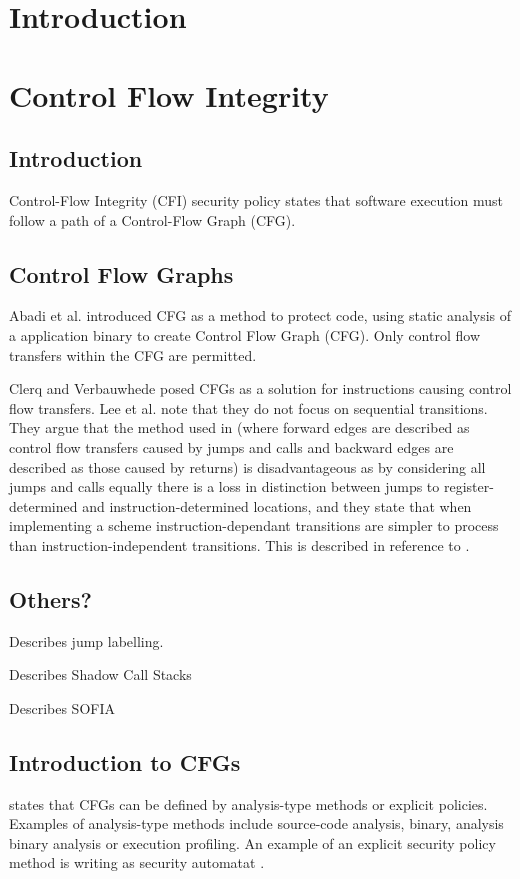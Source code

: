 \section{Introduction}
\section{Control Flow Integrity}
\subsection{Introduction}
Control-Flow Integrity (CFI) security policy states that software execution must follow a path of a Control-Flow Graph (CFG).
\subsection{Control Flow Graphs}
Abadi et al. \cite{Abadi2005}introduced CFG as a method to protect code, using static analysis of a application binary to create Control Flow Graph (CFG). Only control flow transfers within the CFG are permitted.

Clerq and Verbauwhede \cite{DeClercq2017} posed CFGs as a solution for instructions causing control flow transfers. Lee et al. \cite{Lee2019} note that they do not focus on sequential transitions. They argue that the method used in \cite{DeClercq2017} (where forward edges are described as control flow transfers caused by jumps and calls and backward edges are described as those caused by returns) is disadvantageous as by considering all jumps and calls equally there is a loss in distinction between jumps to register-determined and instruction-determined locations, and they state that when implementing a scheme instruction-dependant transitions are simpler to process than instruction-independent transitions. This is described in reference to \cite{Lee2016}.
\ifnotesincluded
{}
\fi
\subsection{Others?}
\cite{Abadi2005} Describes jump labelling. 

\cite{DeClercq2017} Describes Shadow Call Stacks

\cite{DeClercq2017b} Describes SOFIA 

\subsection{Introduction to CFGs}
\cite{Abadi2005} states that CFGs can be defined by analysis-type methods or explicit policies. Examples of analysis-type methods include source-code analysis, binary, analysis binary analysis or execution profiling. An example of an explicit security policy method is writing as security automatat \cite{Erlingsson2004}.


